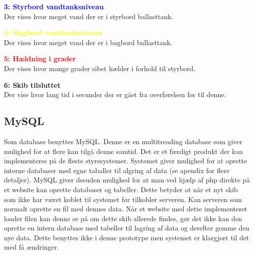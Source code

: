 \textcolor{blue}{\textbf{3: Styrbord vandtanksniveau}}\\
Der vises hvor meget vand der er i styrbord ballasttank.

\textcolor{yellow}{\textbf{4: Bagbord vandtanksniveau}}\\
Der vises hvor meget vand der er i bagbord ballasttank.

\textcolor{red}{\textbf{5: Hældning i grader}}\\
Der vises hvor mange grader sibet hælder i forhold til styrbord.

\textcolor{RoyalPurple}{\textbf{6: Skib tilsluttet}}\\
Der vise hvor lang tid i secunder der er gået fra overførelsen før til denne.


\subsection{MySQL}
Som database benyttes MySQL. Denne er en multitreading database som giver mulighed for at flere kan tilgå denne samtid. Det er et færdigt produkt der kan implementeres på de fleste styresystemer. Systemet giver mulighed for at oprette interne databaser med egne taballer til algring af data (se apendix for flere detaljer).
MySQL giver desuden mulighed for at man ved hjælp af php direkte på et website kan oprette databaser og tabeller. Dette betyder at når et nyt skib som ikke har været koblet til systemet før tilkobler serveren. Kan serveren som normalt oprette en fil med dennes data. Når et website med dette implementeret loader filen kan denne se på om dette skib allerede findes, gør det ikke kan den oprette en intern database med tabeller til lagring af data og derefter gemme den nye data. Dette benyttes ikke i denne prototype men systemet er klargjort til det med få ændringer.